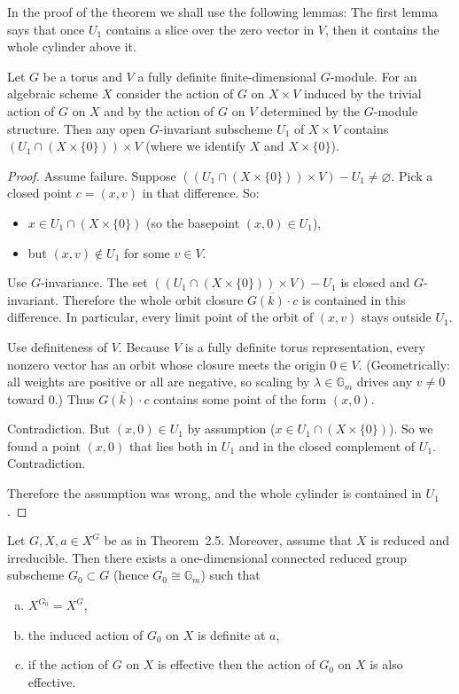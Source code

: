 \documentclass[12pt]{article}
\begin{document}
In the proof of the theorem we shall use the following lemmas:
The first lemma says that once $U_1$ contains a slice over the zero vector in $V$, then it contains the whole cylinder above it.
\begin{lemma}[2.2]
Let $G$ be a torus and $V$ a fully definite finite-dimensional $G$-module.  
For an algebraic scheme $X$ consider the action of $G$ on $X \times V$ induced by the trivial action of $G$ on $X$ and by the action of $G$ on $V$ determined by the $G$-module structure.  
Then any open $G$-invariant subscheme $U_1$ of $X \times V$ contains $(U_1 \cap (X \times \{0\})) \times V$ (where we identify $X$ and $X \times \{0\}$).
\end{lemma}
\begin{proof}
Assume failure. Suppose $((U_1 \cap (X \times \{0\})) \times V) - U_1 \neq \varnothing$.
Pick a closed point $c = (x,v)$ in that difference.
So:
\begin{itemize}
\item $x \in U_1 \cap (X \times \{0\})$ (so the basepoint $(x,0)\in U_1$),
\item but $(x,v)\notin U_1$ for some $v\in V$.
\end{itemize}

Use $G$-invariance.
The set $((U_1 \cap (X \times \{0\})) \times V) - U_1$ is closed and $G$-invariant.
Therefore the whole orbit closure $\overline{G(k)\cdot c}$ is contained in this difference.
In particular, every limit point of the orbit of $(x,v)$ stays outside $U_1$.

Use definiteness of $V$.
Because $V$ is a fully definite torus representation, every nonzero vector has an orbit whose closure meets the origin $0\in V$.
(Geometrically: all weights are positive or all are negative, so scaling by $\lambda\in \mathbb{G}_m$ drives any $v\neq 0$ toward $0$.)
Thus $\overline{G(k)\cdot c}$ contains some point of the form $(x,0)$.

Contradiction.
But $(x,0)\in U_1$ by assumption ($x\in U_1 \cap (X\times\{0\})$).
So we found a point $(x,0)$ that lies both in $U_1$ and in the closed complement of $U_1$. Contradiction.

Therefore the assumption was wrong, and the whole cylinder is contained in $U_1$.
\end{proof}

\begin{lemma}[2.3]
Let $G, X, a \in X^G$ be as in Theorem~2.5. Moreover, assume that $X$ is reduced and irreducible.  
Then there exists a one-dimensional connected reduced group subscheme $G_0 \subset G$ (hence $G_0 \cong \mathbb{G}_m$) such that
\begin{enumerate}[(a)]
  \item $X^{G_0} = X^G$,
  \item the induced action of $G_0$ on $X$ is definite at $a$,
  \item if the action of $G$ on $X$ is effective then the action of $G_0$ on $X$ is also effective.
\end{enumerate}
\end{lemma}
\end{document}
